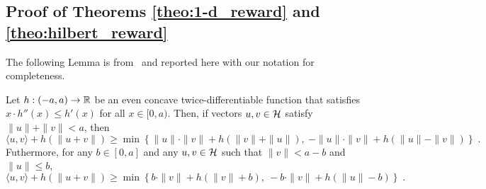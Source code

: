 \subsection{Proof of Theorems \ref{theo:1-d_reward} and \ref{theo:hilbert_reward}}

The following Lemma is from~\cite{McMahanO14} and reported here with our notation for completeness.
\begin{lemma}[Extremes]
\label{lemma:extremes}
Let $h:(-a,a) \to \mathbb{R}$ be an even concave twice-differentiable function that
satisfies $x \cdot h''(x) \le h'(x)$ for all $x \in [0,a)$. Then, if vectors
$u,v \in \mathcal{H}$ satisfy $\|u\| + \|v\| < a$, then
\begin{equation}
\label{equation:lemma-extremes-1}
\langle u, v \rangle + h(\|u + v\|) \ge \min \left\{ \|u\| \cdot \|v\| + h(\|v\| + \|u\|), \ - \|u\| \cdot \|v\| + h(\|u\| - \|v\|) \right\} \; .
\end{equation}
Futhermore, for any $b \in [0,a]$ and any $u, v \in \mathcal{H}$ such that $\|v\| < a - b$ and $\|u\| \le b$,
\begin{equation}
\label{equation:lemma-extremes-2}
\langle u, v \rangle + h(\|u + v\|) \ge \min \left\{ b \cdot \|v\| + h(\|v\| + b), \ - b \cdot \|v\| + h(\|u\| - b) \right\} \; .
\end{equation}
\end{lemma}
